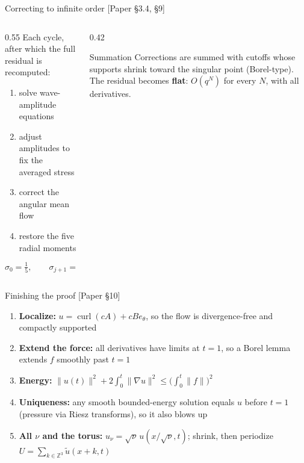 \documentclass[aspectratio=169,11pt]{beamer}
\newcommand{\src}[1]{{\scriptsize\color{accent}\textsf{[#1]}}}
\begin{document}
\begin{frame}{Correcting to infinite order \src{Paper \S3.4, \S9}}
\begin{columns}[c]
\begin{column}{0.55\textwidth}
\small Each cycle, after which the full residual is recomputed:
\begin{enumerate}\small
\item solve wave-amplitude equations
\item adjust amplitudes to fix the averaged stress
\item correct the angular mean flow
\item restore the five radial moments
\end{enumerate}
\[
\sigma_0=\tfrac15,\qquad \sigma_{j+1}=\sigma_j+\tfrac1{10}\ \to\ \infty
\]
\end{column}
\begin{column}{0.42\textwidth}
\begin{block}{Summation}
\small Corrections are summed with cutoffs whose supports shrink toward the singular point (Borel-type). The residual becomes \textbf{flat}: $O(q^N)$ for every $N$, with all derivatives.
\end{block}
\end{column}
\end{columns}
\end{frame}

\begin{frame}{Finishing the proof \src{Paper \S10}}
\small
\begin{enumerate}
\item \textbf{Localize:} $u=\operatorname{curl}(cA)+cBe_\theta$, so the flow is divergence-free and compactly supported
\item \textbf{Extend the force:} all derivatives have limits at $t=1$, so a Borel lemma extends $f$ smoothly past $t=1$
\item \textbf{Energy:} $\|u(t)\|^2+2\!\int_0^t\!\|\nabla u\|^2\le\Big(\int_0^t\|f\|\Big)^2$
\item \textbf{Uniqueness:} any smooth bounded-energy solution equals $u$ before $t=1$ (pressure via Riesz transforms), so it also blows up
\item \textbf{All $\nu$ and the torus:} $u_\nu=\sqrt\nu\,u(x/\sqrt\nu,t)$; shrink, then periodize $U=\sum_{k\in\mathbb Z^3}\tilde u(x+k,t)$
\end{enumerate}
\end{frame}
\end{document}
